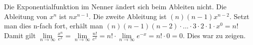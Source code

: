 
\item Die Exponentialfunktion im Nenner ändert sich beim Ableiten nicht. Die Ableitung von $x^n$ ist $n x^{n-1}$. Die zweite Ableitung ist $(n)(n-1) x^{n-2}$. Setzt man dies n-fach fort, erhält man $(n)(n-1)(n-2)\cdot...\cdot 3\cdot 2 \cdot 1 \cdot x^0 = n!$ Damit gilt $\lim\limits_{n\to\infty}\frac{x^n}{e^x} = \lim\limits_{n\to\infty}\frac{n!}{e^x} = n! \cdot \lim\limits_{n\to\infty}e^{-x} = n! \cdot 0 = 0$. Dies war zu zeigen.
